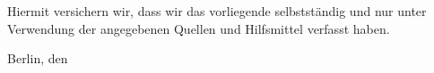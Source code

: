 

Hiermit versichern wir, dass wir das vorliegende \thethesistyp{} selbstständig und nur unter
Verwendung der angegebenen Quellen und Hilfsmittel verfasst haben. 

\vskip 1cm

Berlin, den \thedatum

\vskip 1.5cm

\theautor
